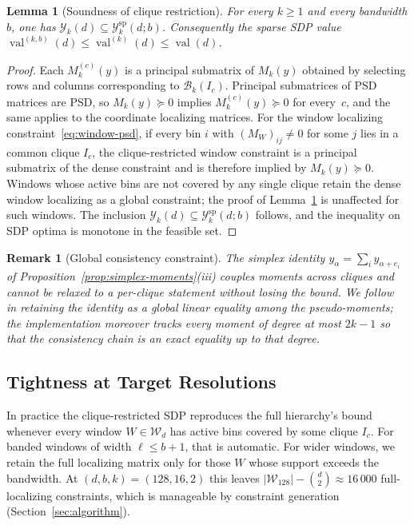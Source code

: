 \documentclass[11pt, letterpaper]{article}
\theoremstyle{paperplain}
\newtheorem{lemma}[theorem]{Lemma}
\theoremstyle{paperdef}
\newtheorem{remark}[theorem]{Remark}
\newcommand{\val}{\operatorname{val}}
\newcommand{\PSD}{\succeq 0}
\begin{document}
\begin{lemma}[Soundness of clique restriction]
\label{lem:clique-soundness}
For every $k\ge 1$ and every bandwidth $b$, one has
$\mathcal{Y}_k(d)\subseteq \mathcal{Y}_k^{\mathrm{sp}}(d;b)$.
Consequently the sparse SDP value
$\val^{(k,b)}(d)\le \val^{(k)}(d)\le \val(d)$.
\end{lemma}

\begin{proof}
Each $M_k^{(c)}(y)$ is a principal submatrix of $M_k(y)$ obtained by
selecting rows and columns corresponding to $\mathcal{B}_k(I_c)$.
Principal submatrices of PSD matrices are PSD, so $M_k(y)\PSD$
implies $M_k^{(c)}(y)\PSD$ for every~$c$, and the same applies to the
coordinate localizing matrices.  For the window localizing
constraint~\eqref{eq:window-psd}, if every bin $i$ with
$(M_W)_{ij}\ne 0$ for some $j$ lies in a common clique $I_c$, the
clique-restricted window constraint is a principal submatrix of the
dense constraint and is therefore implied by $M_k(y)\PSD$.  Windows
whose active bins are not covered by any single clique retain the
dense window localizing as a global constraint; the proof of
Lemma~\ref{lem:clique-soundness} is unaffected for such windows.
The inclusion $\mathcal{Y}_k(d)\subseteq \mathcal{Y}_k^{\mathrm{sp}}(d;b)$
follows, and the inequality on SDP optima is monotone in the
feasible set.
\end{proof}

\begin{remark}[Global consistency constraint]
\label{rem:global-consistency}
The simplex identity $y_\alpha=\sum_i y_{\alpha+e_i}$ of
Proposition~\ref{prop:simplex-moments}(iii) couples moments across
cliques and cannot be relaxed to a per-clique statement without
losing the bound.  We follow~\cite{Waki2006} in retaining the
identity as a global linear equality among the pseudo-moments; the
implementation moreover tracks every moment of degree at most $2k-1$
so that the consistency chain is an exact equality up to that degree.
\end{remark}

\subsection{Tightness at Target Resolutions}

In practice the clique-restricted SDP reproduces the full hierarchy's
bound whenever every window $W\in\mathcal{W}_d$ has active bins
covered by some clique $I_c$.  For banded windows of width
$\ell\le b+1$, that is automatic.  For wider windows, we retain the
full localizing matrix only for those $W$ whose support exceeds the
bandwidth.  At $(d,b,k)=(128,16,2)$ this leaves
$|\mathcal{W}_{128}|-\binom{d}{2}\approx 16\,000$ full-localizing
constraints, which is manageable by constraint generation
(Section~\ref{sec:algorithm}).
\end{document}
